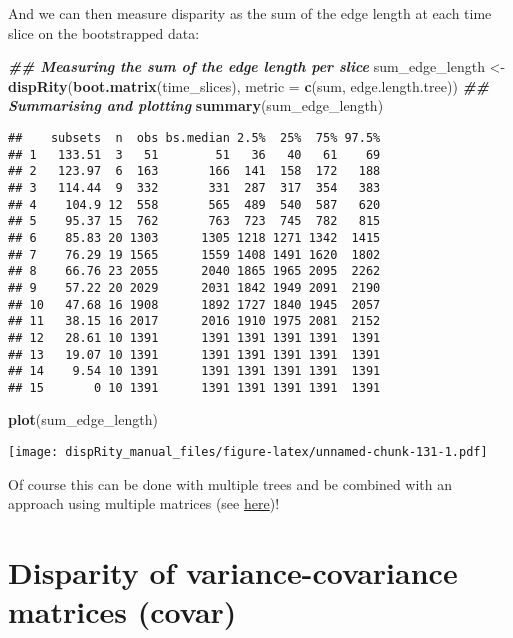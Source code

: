 \documentclass[
]{book}
\newenvironment{Shaded}{\begin{snugshade}}{\end{snugshade}}
\newcommand{\AttributeTok}[1]{\textcolor[rgb]{0.13,0.29,0.53}{#1}}
\newcommand{\DocumentationTok}[1]{\textcolor[rgb]{0.56,0.35,0.01}{\textbf{\textit{#1}}}}
\newcommand{\FunctionTok}[1]{\textcolor[rgb]{0.13,0.29,0.53}{\textbf{#1}}}
\newcommand{\NormalTok}[1]{#1}
\newcommand{\OtherTok}[1]{\textcolor[rgb]{0.56,0.35,0.01}{#1}}
\begin{document}
And we can then measure disparity as the sum of the edge length at each time slice on the bootstrapped data:

\begin{Shaded}
\begin{Highlighting}[]
\DocumentationTok{\#\# Measuring the sum of the edge length per slice}
\NormalTok{sum\_edge\_length }\OtherTok{\textless{}{-}} \FunctionTok{dispRity}\NormalTok{(}\FunctionTok{boot.matrix}\NormalTok{(time\_slices), }\AttributeTok{metric =} \FunctionTok{c}\NormalTok{(sum, edge.length.tree))}
\DocumentationTok{\#\# Summarising and plotting}
\FunctionTok{summary}\NormalTok{(sum\_edge\_length)}
\end{Highlighting}
\end{Shaded}

\begin{verbatim}
##    subsets  n  obs bs.median 2.5%  25%  75% 97.5%
## 1   133.51  3   51        51   36   40   61    69
## 2   123.97  6  163       166  141  158  172   188
## 3   114.44  9  332       331  287  317  354   383
## 4    104.9 12  558       565  489  540  587   620
## 5    95.37 15  762       763  723  745  782   815
## 6    85.83 20 1303      1305 1218 1271 1342  1415
## 7    76.29 19 1565      1559 1408 1491 1620  1802
## 8    66.76 23 2055      2040 1865 1965 2095  2262
## 9    57.22 20 2029      2031 1842 1949 2091  2190
## 10   47.68 16 1908      1892 1727 1840 1945  2057
## 11   38.15 16 2017      2016 1910 1975 2081  2152
## 12   28.61 10 1391      1391 1391 1391 1391  1391
## 13   19.07 10 1391      1391 1391 1391 1391  1391
## 14    9.54 10 1391      1391 1391 1391 1391  1391
## 15       0 10 1391      1391 1391 1391 1391  1391
\end{verbatim}

\begin{Shaded}
\begin{Highlighting}[]
\FunctionTok{plot}\NormalTok{(sum\_edge\_length)}
\end{Highlighting}
\end{Shaded}

\texttt{[image: dispRity\_manual\_files/figure-latex/unnamed-chunk-131-1.pdf]}

Of course this can be done with multiple trees and be combined with an approach using multiple matrices (see \protect\hyperlink{multi.input}{here})!

\hypertarget{covar}{%
\section{Disparity of variance-covariance matrices (covar)}\label{covar}}
\end{document}
